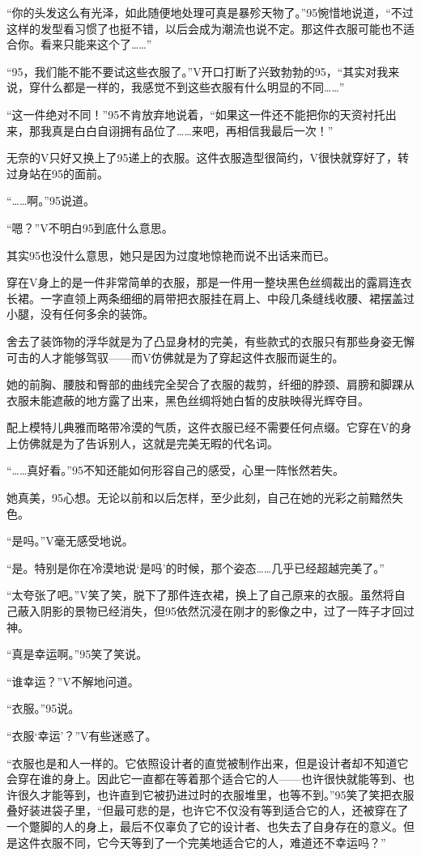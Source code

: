 “你的头发这么有光泽，如此随便地处理可真是暴殄天物了。”95惋惜地说道，“不过这样的发型看习惯了也挺不错，以后会成为潮流也说不定。那这件衣服可能也不适合你。看来只能来这个了……”

“95，我们能不能不要试这些衣服了。”V开口打断了兴致勃勃的95，“其实对我来说，穿什么都是一样的，我感觉不到这些衣服有什么明显的不同……”

“这一件绝对不同！”95不肯放弃地说着，“如果这一件还不能把你的天资衬托出来，那我真是白白自诩拥有品位了……来吧，再相信我最后一次！”

无奈的V只好又换上了95递上的衣服。这件衣服造型很简约，V很快就穿好了，转过身站在95的面前。

“……啊。”95说道。

“嗯？”V不明白95到底什么意思。

其实95也没什么意思，她只是因为过度地惊艳而说不出话来而已。

穿在V身上的是一件非常简单的衣服，那是一件用一整块黑色丝绸裁出的露肩连衣长裙。一字直领上两条细细的肩带把衣服挂在肩上、中段几条缝线收腰、裙摆盖过小腿，没有任何多余的装饰。

舍去了装饰物的浮华就是为了凸显身材的完美，有些款式的衣服只有那些身姿无懈可击的人才能够驾驭——而V仿佛就是为了穿起这件衣服而诞生的。

她的前胸、腰肢和臀部的曲线完全契合了衣服的裁剪，纤细的脖颈、肩膀和脚踝从衣服未能遮蔽的地方露了出来，黑色丝绸将她白皙的皮肤映得光辉夺目。

配上模特儿典雅而略带冷漠的气质，这件衣服已经不需要任何点缀。它穿在V的身上仿佛就是为了告诉别人，这就是完美无暇的代名词。

“……真好看。”95不知还能如何形容自己的感受，心里一阵怅然若失。

她真美，95心想。无论以前和以后怎样，至少此刻，自己在她的光彩之前黯然失色。

“是吗。”V毫无感受地说。

“是。特别是你在冷漠地说‘是吗’的时候，那个姿态……几乎已经超越完美了。”

“太夸张了吧。”V笑了笑，脱下了那件连衣裙，换上了自己原来的衣服。虽然将自己蔽入阴影的景物已经消失，但95依然沉浸在刚才的影像之中，过了一阵子才回过神。

“真是幸运啊。”95笑了笑说。

“谁幸运？”V不解地问道。

“衣服。”95说。

“衣服‘幸运’？”V有些迷惑了。

“衣服也是和人一样的。它依照设计者的直觉被制作出来，但是设计者却不知道它会穿在谁的身上。因此它一直都在等着那个适合它的人——也许很快就能等到、也许很久才能等到，也许直到它被扔进过时的衣服堆里，也等不到。”95笑了笑把衣服叠好装进袋子里，“但最可悲的是，也许它不仅没有等到适合它的人，还被穿在了一个蹩脚的人的身上，最后不仅辜负了它的设计者、也失去了自身存在的意义。但是这件衣服不同，它今天等到了一个完美地适合它的人，难道还不幸运吗？”

